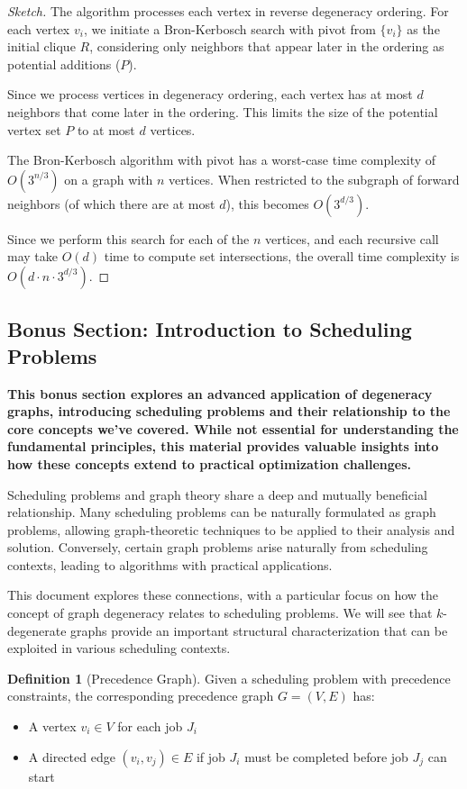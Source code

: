 \documentclass{article}
\theoremstyle{definition}
\newtheorem{definition}{Definition}
\begin{document}
\begin{proof}[Sketch]
The algorithm processes each vertex in reverse degeneracy ordering. For each vertex $v_i$, we initiate a Bron-Kerbosch search with pivot from $\{v_i\}$ as the initial clique $R$, considering only neighbors that appear later in the ordering as potential additions ($P$).

Since we process vertices in degeneracy ordering, each vertex has at most $d$ neighbors that come later in the ordering. This limits the size of the potential vertex set $P$ to at most $d$ vertices.

The Bron-Kerbosch algorithm with pivot has a worst-case time complexity of $O(3^{n/3})$ on a graph with $n$ vertices. When restricted to the subgraph of forward neighbors (of which there are at most $d$), this becomes $O(3^{d/3})$.

Since we perform this search for each of the $n$ vertices, and each recursive call may take $O(d)$ time to compute set intersections, the overall time complexity is $O(d \cdot n \cdot 3^{d/3})$.
\end{proof}

\subsection{Bonus Section: Introduction to Scheduling Problems}
\textbf{This bonus section explores an advanced application of degeneracy graphs, introducing scheduling problems and their relationship to the core concepts we've covered. While not essential for understanding the fundamental principles, this material provides valuable insights into how these concepts extend to practical optimization challenges.}


Scheduling problems and graph theory share a deep and mutually beneficial relationship. Many scheduling problems can be naturally formulated as graph problems, allowing graph-theoretic techniques to be applied to their analysis and solution. Conversely, certain graph problems arise naturally from scheduling contexts, leading to algorithms with practical applications.

This document explores these connections, with a particular focus on how the concept of graph degeneracy relates to scheduling problems. We will see that $k$-degenerate graphs provide an important structural characterization that can be exploited in various scheduling contexts.

\begin{definition}[Precedence Graph]
Given a scheduling problem with precedence constraints, the corresponding precedence graph $G = (V, E)$ has:
\begin{itemize}
    \item A vertex $v_i \in V$ for each job $J_i$
    \item A directed edge $(v_i, v_j) \in E$ if job $J_i$ must be completed before job $J_j$ can start
\end{itemize}
\end{definition}
\end{document}
